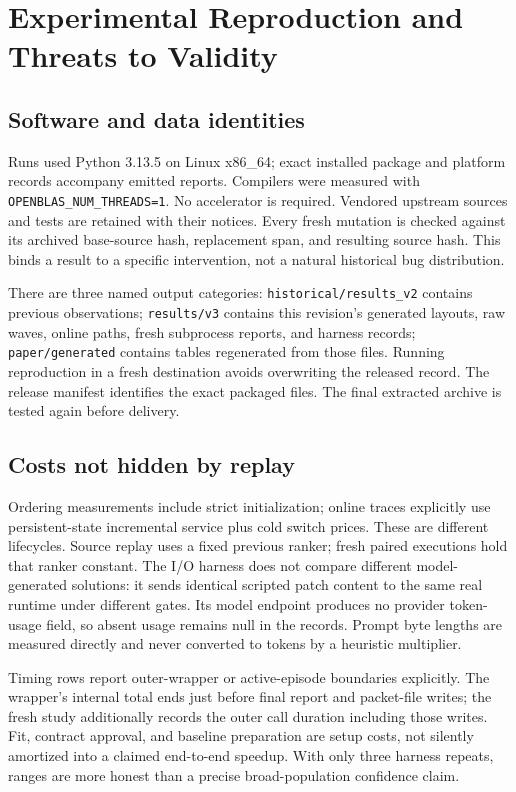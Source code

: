 \section{Experimental Reproduction and Threats to Validity}
\subsection{Software and data identities}
Runs used Python 3.13.5 on Linux x86\_64; exact installed package and platform records accompany emitted reports. Compilers were measured with \texttt{OPENBLAS\_NUM\_THREADS=1}. No accelerator is required. Vendored upstream sources and tests are retained with their notices. Every fresh mutation is checked against its archived base-source hash, replacement span, and resulting source hash. This binds a result to a specific intervention, not a natural historical bug distribution.

There are three named output categories: \texttt{historical/results\_v2} contains previous observations; \texttt{results/v3} contains this revision's generated layouts, raw waves, online paths, fresh subprocess reports, and harness records; \texttt{paper/generated} contains tables regenerated from those files. Running reproduction in a fresh destination avoids overwriting the released record. The release manifest identifies the exact packaged files. The final extracted archive is tested again before delivery.

\subsection{Costs not hidden by replay}
Ordering measurements include strict initialization; online traces explicitly use persistent-state incremental service plus cold switch prices. These are different lifecycles. Source replay uses a fixed previous ranker; fresh paired executions hold that ranker constant. The I/O harness does not compare different model-generated solutions: it sends identical scripted patch content to the same real runtime under different gates. Its model endpoint produces no provider token-usage field, so absent usage remains null in the records. Prompt byte lengths are measured directly and never converted to tokens by a heuristic multiplier.

Timing rows report outer-wrapper or active-episode boundaries explicitly. The wrapper's internal total ends just before final report and packet-file writes; the fresh study additionally records the outer call duration including those writes. Fit, contract approval, and baseline preparation are setup costs, not silently amortized into a claimed end-to-end speedup. With only three harness repeats, ranges are more honest than a precise broad-population confidence claim.

